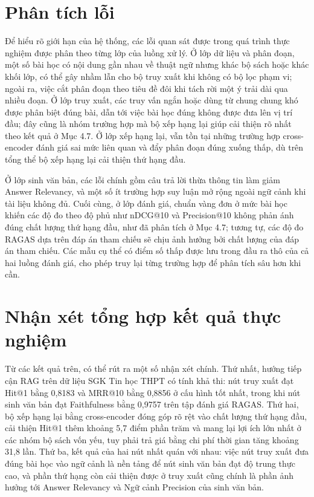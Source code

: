 \documentclass[../DoAn.tex]{subfiles}
\begin{document}
\section{Phân tích lỗi}
\label{sec:error-analysis}

Để hiểu rõ giới hạn của hệ thống, các lỗi quan sát được trong quá trình thực nghiệm được phân theo từng lớp của luồng xử lý. Ở lớp dữ liệu và phân đoạn, một số bài học có nội dung gần nhau về thuật ngữ nhưng khác bộ sách hoặc khác khối lớp, có thể gây nhầm lẫn cho bộ truy xuất khi không có bộ lọc phạm vi; ngoài ra, việc cắt phân đoạn theo tiêu đề đôi khi tách rời một ý trải dài qua nhiều đoạn. Ở lớp truy xuất, các truy vấn ngắn hoặc dùng từ chung chung khó được phân biệt đúng bài, dẫn tới việc bài học đúng không được đưa lên vị trí đầu; đây cũng là nhóm trường hợp mà bộ xếp hạng lại giúp cải thiện rõ nhất theo kết quả ở Mục 4.7. Ở lớp xếp hạng lại, vẫn tồn tại những trường hợp cross-encoder đánh giá sai mức liên quan và đẩy phân đoạn đúng xuống thấp, dù trên tổng thể bộ xếp hạng lại cải thiện thứ hạng đầu.

Ở lớp sinh văn bản, các lỗi chính gồm câu trả lời thừa thông tin làm giảm Answer Relevancy, và một số ít trường hợp suy luận mở rộng ngoài ngữ cảnh khi tài liệu không đủ. Cuối cùng, ở lớp đánh giá, chuẩn vàng đơn ở mức bài học khiến các độ đo theo độ phủ như nDCG@10 và Precision@10 không phản ánh đúng chất lượng thứ hạng đầu, như đã phân tích ở Mục 4.7; tương tự, các độ đo RAGAS dựa trên đáp án tham chiếu sẽ chịu ảnh hưởng bởi chất lượng của đáp án tham chiếu. Các mẫu cụ thể có điểm số thấp được lưu trong đầu ra thô của cả hai luồng đánh giá, cho phép truy lại từng trường hợp để phân tích sâu hơn khi cần.

\section{Nhận xét tổng hợp kết quả thực nghiệm}

Từ các kết quả trên, có thể rút ra một số nhận xét chính. Thứ nhất, hướng tiếp cận RAG trên dữ liệu SGK Tin học THPT có tính khả thi: nút truy xuất đạt Hit@1 bằng 0,8183 và MRR@10 bằng 0,8856 ở cấu hình tốt nhất, trong khi nút sinh văn bản đạt Faithfulness bằng 0,9757 trên tập đánh giá RAGAS. Thứ hai, bộ xếp hạng lại bằng cross-encoder đóng góp rõ rệt vào chất lượng thứ hạng đầu, cải thiện Hit@1 thêm khoảng 5,7 điểm phần trăm và mang lại lợi ích lớn nhất ở các nhóm bộ sách vốn yếu, tuy phải trả giá bằng chi phí thời gian tăng khoảng 31,8 lần. Thứ ba, kết quả của hai nút nhất quán với nhau: việc nút truy xuất đưa đúng bài học vào ngữ cảnh là nền tảng để nút sinh văn bản đạt độ trung thực cao, và phần thứ hạng còn cải thiện được ở truy xuất cũng chính là phần ảnh hưởng tới Answer Relevancy và Ngữ cảnh Precision của sinh văn bản.
\end{document}
